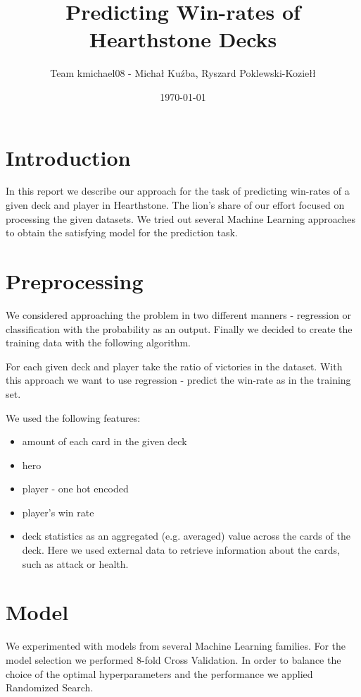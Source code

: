 \documentclass[a4paper]{article}
\title{Predicting Win-rates of Hearthstone Decks}
\author{Team kmichael08 - Michał Kuźba, Ryszard Poklewski-Koziełł}
\date{\today}
\begin{document}
\maketitle

\section{Introduction}
\label{sec:introduction}
In this report we describe our approach for the task of predicting win-rates of a given deck and player in Hearthstone. 
The lion's share of our effort focused on processing the given datasets.
We tried out several Machine Learning approaches to obtain the satisfying model for the prediction task.

\section{Preprocessing}
We considered approaching the problem in two different manners - regression or classification with the probability as an output. 
Finally we decided to create the training data with the following algorithm.

For each given deck and player take the ratio of victories in the dataset.
With this approach we want to use regression - predict the win-rate as in the training set.

We used the following features:
\begin{itemize}
\item amount of each card in the given deck
\item hero
\item player - one hot encoded
\item player's win rate
\item deck statistics as an aggregated (e.g. averaged) value across the cards of the deck. Here we used external data to retrieve information about the cards, such as attack or health.

\end{itemize}

\section{Model}
We experimented with models from several Machine Learning families.
For the model selection we performed 8-fold Cross Validation. 
In order to balance the choice of the optimal hyperparameters and the performance we applied Randomized Search.
\end{document}
